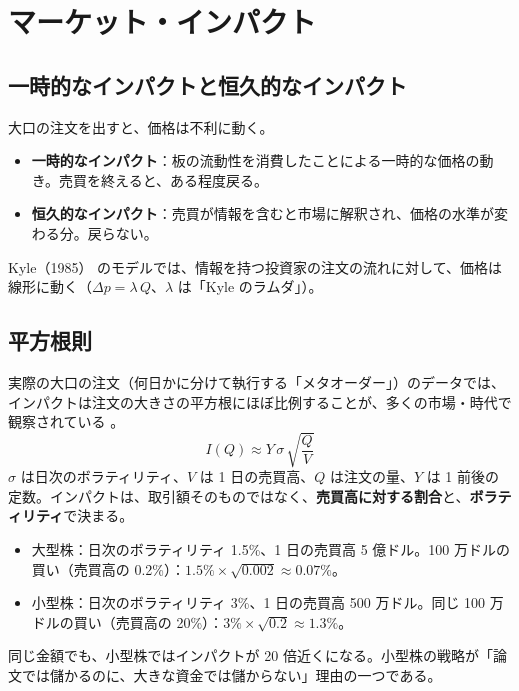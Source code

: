 \section{マーケット・インパクト}

\subsection{一時的なインパクトと恒久的なインパクト}

大口の注文を出すと、価格は不利に動く。
\begin{itemize}
\item \textbf{一時的なインパクト}：板の流動性を消費したことによる一時的な価格の動き。売買を終えると、ある程度戻る。
\item \textbf{恒久的なインパクト}：売買が情報を含むと市場に解釈され、価格の水準が変わる分。戻らない。
\end{itemize}

Kyle（1985）\cite{kyle1985} のモデルでは、情報を持つ投資家の注文の流れに対して、価格は線形に動く（$\Delta p = \lambda\,Q$、$\lambda$ は「Kyle のラムダ」）。

\subsection{平方根則}

実際の大口の注文（何日かに分けて執行する「メタオーダー」）のデータでは、インパクトは注文の大きさの平方根にほぼ比例することが、多くの市場・時代で観察されている \cite{athl2005,toth2011,bouchaud2018}。
\begin{equation}
I(Q) \approx Y\,\sigma\,\sqrt{\frac{Q}{V}}
\label{eq:sqrt}
\end{equation}
$\sigma$ は日次のボラティリティ、$V$ は 1 日の売買高、$Q$ は注文の量、$Y$ は 1 前後の定数。インパクトは、取引額そのものではなく、\textbf{売買高に対する割合}と、\textbf{ボラティリティ}で決まる。

\begin{exbox}[平方根則で見積もる]
\begin{itemize}
\item 大型株：日次のボラティリティ 1.5\%、1 日の売買高 5 億ドル。100 万ドルの買い（売買高の 0.2\%）：$1.5\% \times \sqrt{0.002} \approx 0.07\%$。
\item 小型株：日次のボラティリティ 3\%、1 日の売買高 500 万ドル。同じ 100 万ドルの買い（売買高の 20\%）：$3\% \times \sqrt{0.2} \approx 1.3\%$。
\end{itemize}
同じ金額でも、小型株ではインパクトが 20 倍近くになる。小型株の戦略が「論文では儲かるのに、大きな資金では儲からない」理由の一つである。
\end{exbox}

